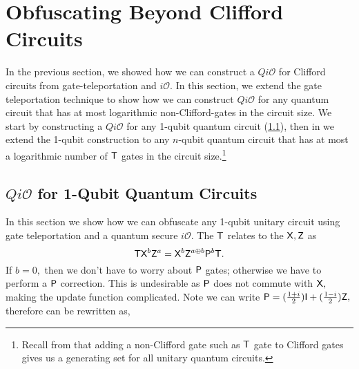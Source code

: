 
\section{Obfuscating Beyond Clifford Circuits}
\label{QiO:Clifford+T:family}
In the previous section, we showed how we can construct a $Qi\mathcal{O}$ for Clifford circuits from gate-teleportation and $i\mathcal{O}.$ In this section, we extend the gate teleportation technique to show how we can construct $Qi\mathcal{O}$ for any quantum circuit that has at most logarithmic non-Clifford-gates in the circuit size.  We start by constructing a $Qi\mathcal{O}$ for any 1-qubit quantum circuit (\cref{QiO:Clifford+T:family+GT}), then in   we extend the 1-qubit construction to any $n$-qubit quantum circuit that has at most a logarithmic number of  ${\sf T}$ gates in the circuit size.\footnote{Recall from   that adding a non-Clifford gate  such as ${\sf T}$ gate to Clifford gates gives us a generating set for all unitary quantum circuits.}



\subsection{$Qi\mathcal{O}$ for 1-Qubit Quantum Circuits}
\label{QiO:Clifford+T:family+GT}
In this section we show how we can obfuscate any 1-qubit unitary circuit using gate teleportation and a quantum secure $i\mathcal{O}.$  The ${\sf T}$ relates to the ${\sf X}, {\sf Z}$ as
\begin{equation}
\label{eq:pgate}
{\sf T} {\sf X}^b {\sf Z}^a={\sf X}^b {\sf Z}^{a\oplus b}{\sf P}^b {\sf T}.
\end{equation}
If $b=0,$ then we don't have to worry about ${\sf P}$ gates; otherwise we have to perform a ${\sf P}$ correction. This is undesirable as ${\sf P}$ does not commute with ${\sf X},$ making the update function complicated. Note we can write ${\sf P}=(\frac{1+i}{2}) {\sf I} + (\frac{1-i}{2}){\sf Z},$ therefore   can be rewritten as,

